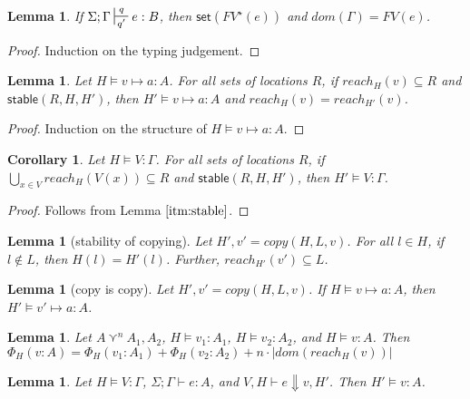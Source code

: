 \documentclass{easychair}
\newcommand{\stable}[1]{\mathsf{stable}(#1)}
\newcommand{\set}[1]{\mathsf{set}(#1)}
\newtheorem{lemma}[theorem]{Lemma}
\newtheorem{corollary}[theorem]{Corollary}
\theoremstyle{definition}
\begin{document}
\begin{lemma}\label{itm:linear}
\label{a} If $\Sigma; \Gamma \sststile{q'}{q} e : B$, then $\set{FV^{\star}(e)}$ and $dom(\Gamma) = FV(e)$.
\end{lemma}

\begin{proof}
Induction on the typing judgement.
\end{proof}

\begin{lemma}\label{itm:stable}
Let $H \vDash v \mapsto a : A$. For all sets of locations $R$, if $reach_H(v) \subseteq R$ and $\stable{R,H,H'}$, then $H' \vDash v \mapsto a : A$ and $reach_H(v) = reach_{H'}(v)$.
\end{lemma}

\begin{proof}
Induction on the structure of $H \vDash v \mapsto a : A$.
\end{proof}

\begin{corollary}
Let $H \vDash V : \Gamma$. For all sets of locations $R$, if $\bigcup_{x \in V} reach_H(V(x)) \subseteq R$ and $\stable{R,H,H'}$, then $H' \vDash V : \Gamma$.
\end{corollary}

\begin{proof}
Follows from Lemma $\ref{itm:stable}$.
\end{proof}


\begin{lemma}[stability of copying]\label{itm:copyStable}
	Let $H',v' = copy(H,L,v)$. For all $l \in H$, if $l \notin L$, then $H(l) = H'(l)$. 
	Further, $reach_{H'}(v') \subseteq L$.
\end{lemma}

\begin{lemma}[copy is copy]
	Let $H',v' = copy(H,L,v)$. If $H \vDash v \mapsto a : A$, then $H' \vDash v' \mapsto a : A$.
\end{lemma}

\begin{lemma}\label{itm:shareSize}
	Let $A \curlyvee^n A_1,A_2$, $H \vDash v_1 : A_1$, $H \vDash v_2 : A_2$, 
	and $H \vDash v : A$. Then $\Phi_{H}(v : A) = 
	\Phi_{H}(v_1 : A_1) + \Phi_{H}(v_2 : A_2) + n\cdot |dom(reach_H(v))|$
\end{lemma}

\begin{lemma}\label{itm:wellFormed}
	Let $H \vDash V : \Gamma$, $\Sigma;\Gamma \vdash e : A$, and $V,H \vdash e \Downarrow v,H'$. Then 
	$H' \vDash v : A$.
\end{lemma}
\end{document}
